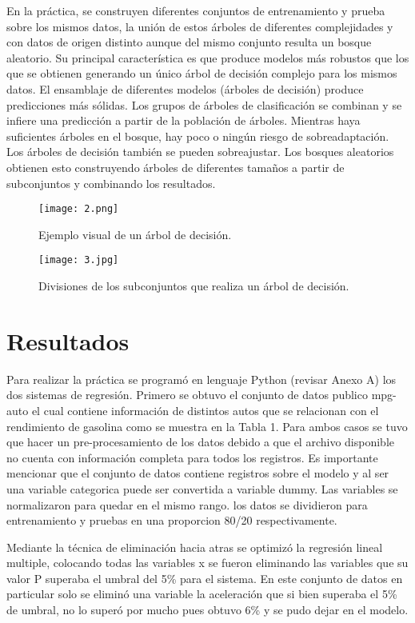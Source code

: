 \documentclass[conference]{IEEEtran}
\begin{document}
En la práctica, se construyen diferentes conjuntos de entrenamiento y prueba sobre los mismos datos, la unión de estos árboles de diferentes complejidades y con datos de origen distinto aunque del mismo conjunto resulta un bosque aleatorio. Su principal característica es que produce modelos más robustos que los que se obtienen generando un único árbol de decisión complejo para los mismos datos. El ensamblaje de diferentes modelos (árboles de decisión) produce predicciones más sólidas. Los grupos de árboles de clasificación se combinan y se infiere una predicción a partir de la población de árboles. Mientras haya suficientes árboles en el bosque, hay poco o ningún riesgo de sobreadaptación. Los árboles de decisión también se pueden sobreajustar. Los bosques aleatorios obtienen esto construyendo árboles de diferentes tamaños a partir de subconjuntos y combinando los resultados.

\begin{figure}[h]
    \centering
    \texttt{[image: 2.png]}
    \caption{Ejemplo visual de un árbol de decisión.}
    \label{fig:mesh1}
\end{figure}

\begin{figure}[h]
    \centering
    \texttt{[image: 3.jpg]}
    \caption{Divisiones de los subconjuntos que realiza un árbol de decisión.}
    \label{fig:mesh1}
\end{figure}

\section{Resultados}
Para realizar la práctica se programó en lenguaje Python (revisar Anexo A) los dos sistemas de regresión. Primero se obtuvo el conjunto de datos publico mpg-auto el cual contiene información de distintos autos que se relacionan con el rendimiento de gasolina como se muestra en la Tabla 1. Para ambos casos se tuvo que hacer un pre-procesamiento de los datos debido a que el archivo disponible no cuenta con información completa para todos los registros. Es importante mencionar que el conjunto de datos contiene registros sobre el modelo y al ser una variable categorica puede ser convertida a variable dummy. Las variables se normalizaron para quedar en el mismo rango. los datos se dividieron para entrenamiento y pruebas en una proporcion 80/20 respectivamente.

Mediante la técnica de eliminación hacia atras se optimizó la regresión lineal multiple, colocando todas las variables x se fueron eliminando las variables que su valor P superaba el umbral del 5\% para el sistema.  En este conjunto de datos en particular solo se eliminó una variable la aceleración que si bien superaba el 5\% de umbral, no lo superó por mucho pues obtuvo 6\% y se pudo dejar en el modelo.  
\end{document}
